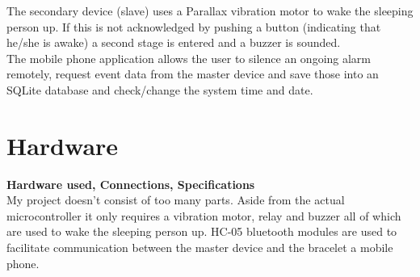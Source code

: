 \documentclass[12pt,a4paper]{article}
\begin{document}
	The secondary device (slave) uses a Parallax vibration motor to wake the sleeping person up. 
	If this is not acknowledged by pushing a button (indicating that he/she is awake) a second stage is entered and a buzzer is sounded.\\
	
	The mobile phone application allows the user to silence an ongoing alarm remotely, request 
	event data from the master device and save those into an SQLite database and check/change the 
	system time and date.\\
	\newpage
	
	\section{Hardware}
	{\bfseries Hardware used, Connections, Specifications}\\
	
	My project doesn't consist of too many parts. Aside from the actual microcontroller it only 
	requires a vibration motor, relay and buzzer all of which are used to wake the sleeping person  
	up. HC-05 bluetooth modules are used to facilitate communication between the master device and  
	the bracelet a mobile phone.
\end{document}
